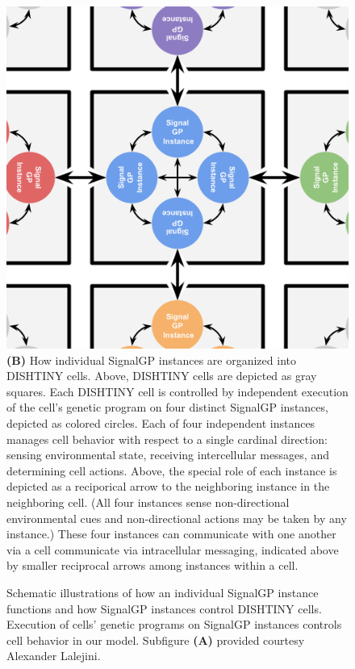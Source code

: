 \begin{figure}
\begin{center}
\begin{minipage}[t]{0.5\linewidth}
\includegraphics[width=0.8\linewidth]{img/dishtinygp-cartoon}\\
{\textbf{(B)}
How individual SignalGP instances are organized into DISHTINY cells.
Above, DISHTINY cells are depicted as gray squares.
Each DISHTINY cell is controlled by independent execution of the cell's genetic program on four distinct SignalGP instances, depicted as colored circles.
Each of four independent instances manages cell behavior with respect to a single cardinal direction: sensing environmental state, receiving intercellular messages, and determining cell actions.
Above, the special role of each instance is depicted as a reciporical arrow to the neighboring instance in the neighboring cell.
(All four instances sense non-directional environmental cues and non-directional actions may be taken by any instance.)
These four instances can communicate with one another via a cell communicate via intracellular messaging, indicated above by smaller reciprocal arrows among instances within a cell.
}
\end{minipage}

\caption{
Schematic illustrations of how an individual SignalGP instance functions and how SignalGP instances control DISHTINY cells.
Execution of cells' genetic programs on SignalGP instances controls cell behavior in our model.
Subfigure \textbf{(A)} provided courtesy Alexander Lalejini.
}
\label{fig:signalgp-dishtinygp}
\end{center}
\end{figure}
